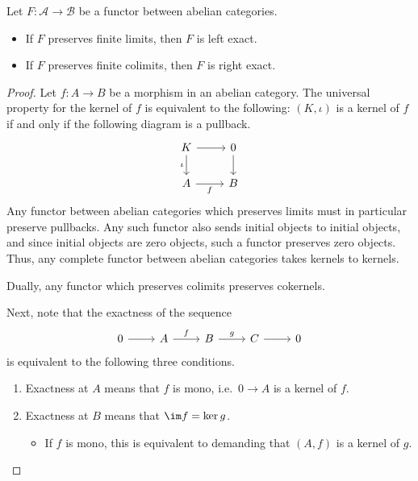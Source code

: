 \documentclass[main.tex]{subfiles}
\begin{document}
\begin{proposition}
  \label{prop:exact_if_preserve_limits_conditions}
  Let $F\colon \mathcal{A} \to \mathcal{B}$ be a functor between abelian categories.
  \begin{itemize}
    \item If $F$ preserves finite limits, then $F$ is left exact.

    \item If $F$ preserves finite colimits, then $F$ is right exact.
  \end{itemize}
\end{proposition}
\begin{proof}
  Let $f\colon A \to B$ be a morphism in an abelian category. The universal property for the kernel of $f$ is equivalent to the following: $(K, \iota)$ is a kernel of $f$ if and only if the following diagram is a pullback.
  \begin{equation*}
    \begin{tikzcd}
      K
      \arrow[r]
      \arrow[d, swap, "\iota"]
      & 0
      \arrow[d]
      \\
      A
      \arrow[r, swap, "f"]
      & B
    \end{tikzcd}
  \end{equation*}
  Any functor between abelian categories which preserves limits must in particular preserve pullbacks. Any such functor also sends initial objects to initial objects, and since initial objects are zero objects, such a functor preserves zero objects. Thus, any complete functor between abelian categories takes kernels to kernels.

  Dually, any functor which preserves colimits preserves cokernels.

  Next, note that the exactness of the sequence
  \begin{equation*}
    \begin{tikzcd}
      0
      \arrow[r]
      & A
      \arrow[r, "f"]
      & B
      \arrow[r, "g"]
      & C
      \arrow[r]
      & 0
    \end{tikzcd}
  \end{equation*}
  is equivalent to the following three conditions.
  \begin{enumerate}
    \item Exactness at $A$ means that $f$ is mono, i.e.\ $0 \to A$ is a kernel of $f$.

    \item Exactness at $B$ means that $\im f = \ker g$.
      \begin{itemize}
        \item If $f$ is mono, this is equivalent to demanding that $(A, f)$ is a kernel of $g$.


\end{itemize}
\end{enumerate}
\end{proof}
\end{document}
